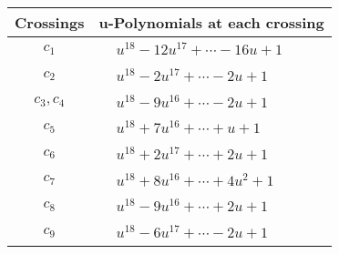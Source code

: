 \documentclass[1p]{elsarticle_modified}
\theoremstyle{definition}
\begin{document}
\begin{tabular}{m{50pt}|m{274pt}}
Crossings & \hspace{64pt}u-Polynomials at each crossing \\
\hline $$\begin{aligned}c_{1}\end{aligned}$$&$\begin{aligned}
&u^{18}-12 u^{17}+\cdots-16 u+1
\end{aligned}$\\
\hline $$\begin{aligned}c_{2}\end{aligned}$$&$\begin{aligned}
&u^{18}-2 u^{17}+\cdots-2 u+1
\end{aligned}$\\
\hline $$\begin{aligned}c_{3},c_{4}\end{aligned}$$&$\begin{aligned}
&u^{18}-9 u^{16}+\cdots-2 u+1
\end{aligned}$\\
\hline $$\begin{aligned}c_{5}\end{aligned}$$&$\begin{aligned}
&u^{18}+7 u^{16}+\cdots+u+1
\end{aligned}$\\
\hline $$\begin{aligned}c_{6}\end{aligned}$$&$\begin{aligned}
&u^{18}+2 u^{17}+\cdots+2 u+1
\end{aligned}$\\
\hline $$\begin{aligned}c_{7}\end{aligned}$$&$\begin{aligned}
&u^{18}+8 u^{16}+\cdots+4 u^2+1
\end{aligned}$\\
\hline $$\begin{aligned}c_{8}\end{aligned}$$&$\begin{aligned}
&u^{18}-9 u^{16}+\cdots+2 u+1
\end{aligned}$\\
\hline $$\begin{aligned}c_{9}\end{aligned}$$&$\begin{aligned}
&u^{18}-6 u^{17}+\cdots-2 u+1
\end{aligned}$\\

\end{tabular}
\end{document}
